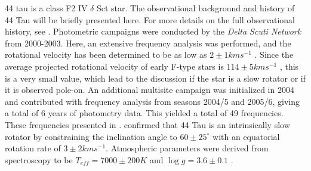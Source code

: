 44 tau is a class F2 IV $\delta$ Sct star. The observational background and history of 44 Tau will be briefly presented here. For more details on the full observational history, see \citet{antoci200744}. Photometric campaigns were conducted by the \textit{Delta Scuti Network} from 2000-2003. Here, an extensive frequency analysis was performed, and the rotational velocity has been determined to be as low as $2 \pm 1 km s^{-1}$ \citep{lenz2008asteroseismic}. Since the average projected rotational velocity of early F-type stars is $114 \pm 5 km s^{-1}$ \citep{royer2004rotational}, this is a very small value, which lead to the discussion if the star is a slow rotator or if it is observed pole-on\citep{antoci200744}. 
 An additional multisite campaign  was initialized in 2004 \citep{zima2007high} and \citet{breger2008A&A} contributed with frequency analysis from seasons  2004/5 and 2005/6, giving a total of 6 years of photometry data. This yielded a total of 49 frequencies. These frequencies presented in . \citet{zima2007high} confirmed that 44 Tau is an intrinsically slow rotator by constraining the inclination angle to $60 \pm 25^{\circ}$ with an equatorial rotation rate of $3 \pm 2 km s^{-1}$. Atmospheric parameters were derived from spectroscopy to be  $T_{eff} = 7000\pm200 K$ and $\log g = 3.6\pm0.1$ \citep{zima2007high}.

